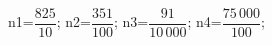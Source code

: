 \documentclass[exercice]{thedocument}%
\begin{document}
%
    \>n1=$\dfrac{825}{10}$;%
    \>n2=$\dfrac{351}{100}$;%
    \>n3=$\dfrac{91}{10\,000}$;%
    \>n4=$\dfrac{75\,000}{100}$;%
\end{document}
